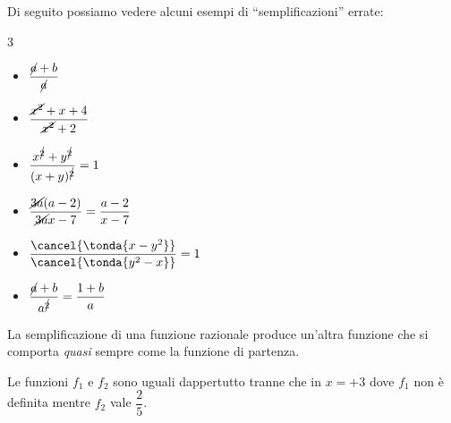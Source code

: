 
Di seguito possiamo vedere alcuni esempi di ``semplificazioni'' errate:
\begin{htmulticols}{3}
\begin{itemize}
\item \(\dfrac{\cancel{a}+b}{\cancel{a}}\)
\item \(\dfrac{\cancel{x^2}+x+4}{\cancel{x^2}+2}\) 
\item \(\dfrac{x^{\cancel{2}}+y^{\cancel{2}}}{(x+y)^{\cancel{2}}}=1\) 
\item \(\dfrac{\cancel{3a}(a-2)}{\cancel{3a}x-7}=\dfrac{a-2}{x-7}\) 
\item \(\dfrac{\cancel{ \tonda{x-y^2}}}
            {\cancel{ \tonda{y^2-x}}}=1\)
\item \(\dfrac{\cancel{a}+b}{a^{\cancel{2}}}=\dfrac{1+b}{a}\)
\end{itemize}
\end{htmulticols}

La semplificazione di una funzione razionale produce un'altra funzione 
che si comporta \emph{quasi} sempre come la funzione di partenza.


Le funzioni \(f_1\) e \(f_2\) sono uguali dappertutto tranne che in 
\(x=+3\) dove \(f_1\) non è definita mentre \(f_2\) vale 
\(\dfrac{2}{5}\).

